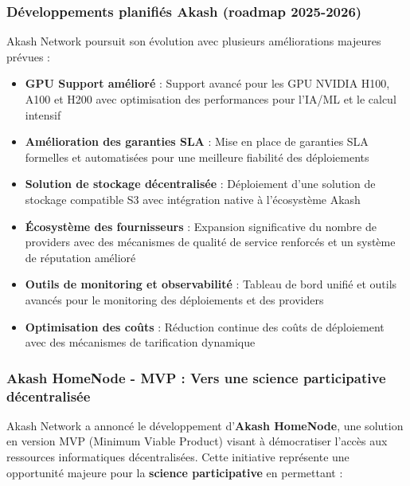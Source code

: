 \documentclass[11pt,a4paper]{article}
\begin{document}
\subsubsection{Développements planifiés Akash (roadmap 2025-2026)}

Akash Network poursuit son évolution avec plusieurs améliorations majeures prévues :

\begin{itemize}
	\item \textbf{GPU Support amélioré} : Support avancé pour les GPU NVIDIA H100, A100 et H200 avec optimisation des performances pour l'IA/ML et le calcul intensif
	
	\item \textbf{Amélioration des garanties SLA} : Mise en place de garanties SLA formelles et automatisées pour une meilleure fiabilité des déploiements
	
	\item \textbf{Solution de stockage décentralisée} : Déploiement d'une solution de stockage compatible S3 avec intégration native à l'écosystème Akash
	
	\item \textbf{Écosystème des fournisseurs} : Expansion significative du nombre de providers avec des mécanismes de qualité de service renforcés et un système de réputation amélioré
	
	\item \textbf{Outils de monitoring et observabilité} : Tableau de bord unifié et outils avancés pour le monitoring des déploiements et des providers
	
	\item \textbf{Optimisation des coûts} : Réduction continue des coûts de déploiement avec des mécanismes de tarification dynamique
\end{itemize}

\subsubsection{Akash HomeNode - MVP : Vers une science participative décentralisée}

Akash Network a annoncé le développement d'\textbf{Akash HomeNode}, une solution en version MVP (Minimum Viable Product) visant à démocratiser l'accès aux ressources informatiques décentralisées. Cette initiative représente une opportunité majeure pour la \textbf{science participative} en permettant :
\end{document}
